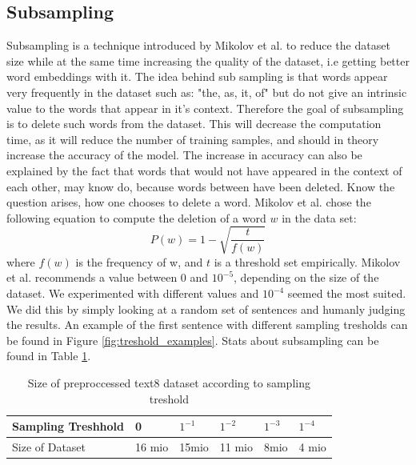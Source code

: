 \subsection{Subsampling}
Subsampling is a technique introduced by Mikolov et al. \cite{mikolov} to reduce the dataset size while at the same time increasing the quality of the dataset, i.e getting better word embeddings with it. The idea behind sub sampling is that words appear very frequently in the dataset such as: "the, as, it, of" but do not give an intrinsic value to the words that appear in it's context. Therefore the goal of subsampling is to delete such words from the dataset. This will decrease the computation time, as it will reduce the number of training samples, and should in theory increase the accuracy of the model. The increase in accuracy can also be explained by the fact that words that would not have appeared in the context of each other, may know do, because words between have been deleted.
Know the question arises, how one chooses to delete a word. Mikolov et al. chose the following equation to compute the deletion of a word $w$ in the data set:
\begin{equation} \label{eq:sampling}
P(w) = 1- \sqrt{{\frac{t}{f(w)}}}
\end{equation}
where $f(w)$ is the frequency of w, and $t$ is a threshold set empirically. Mikolov et al.  recommends a value between $0$ and $10^{-5}$, depending on the size of the dataset. We experimented with different values and $10^{-4}$ seemed the most suited. We did this by simply looking at a random set of sentences and humanly judging the results. An example of the first sentence with different sampling tresholds can be found in Figure \ref{fig:treshold_examples}. Stats about subsampling can be found in Table \ref{table:treshold}. 
\begin{table}[h]
\centering
\begin{tabular}{|l|l|l|l|l|l|}
\hline
Sampling Treshhold &  0      &      $ 1^{-1}$&$   1^{-2}$& $1^{-3}     $ &$1^{-4}   $    \\ \hline
Size of Dataset    & 16 mio & 15mio & 11 mio & 8mio & 4 mio \\ \hline
\end{tabular}
\caption{Size of preproccessed text8 dataset according to sampling treshold}
\label{table:treshold}
\end{table}

